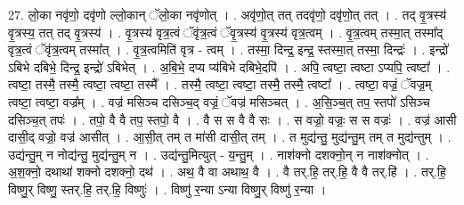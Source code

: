 \documentclass[17pt]{extarticle}
\begin{document}
27. लो॒का नवृ॑णो॒ दवृ॑णो ल्लो॒कान् ॅलो॒का नवृ॑णोत् । . अवृ॑णो॒त् तत् तदवृ॑णो॒ दवृ॑णो॒त् तत् । . तद् वृ॒त्रस्य॑ वृ॒त्रस्य॒ तत् तद् वृ॒त्रस्य॑ । . वृ॒त्रस्य॑ वृत्र॒त्वं ॅवृ॑त्र॒त्वं ॅवृ॒त्रस्य॑ वृ॒त्रस्य॑ वृत्र॒त्वम् । . वृ॒त्र॒त्वम् तस्मा॒त् तस्मा᳚द् वृत्र॒त्वं ॅवृ॑त्र॒त्वम् तस्मा᳚त् । . वृ॒त्र॒त्वमिति॑ वृत्र - त्वम् । . तस्मा॒ दिन्द्र॒ इन्द्र॒ स्तस्मा॒त् तस्मा॒ दिन्द्रः॑ । . इन्द्रो॑ ऽबिभे दबिभे॒ दिन्द्र॒ इन्द्रो॑ ऽबिभेत् । . अ॒बि॒भे॒ दप्य प्य॑बिभे दबिभे॒दपि॑ । . अपि॒ त्वष्टा॒ त्वष्टा ऽप्यपि॒ त्वष्टा᳚ । . त्वष्टा॒ तस्मै॒ तस्मै॒ त्वष्टा॒ त्वष्टा॒ तस्मै᳚ । . तस्मै॒ त्वष्टा॒ त्वष्टा॒ तस्मै॒ तस्मै॒ त्वष्टा᳚ । . त्वष्टा॒ वज्रं॒ ॅवज्र॒म् त्वष्टा॒ त्वष्टा॒ वज्र᳚म् । . वज्र॑ मसिञ्च दसिञ्च॒द् वज्रं॒ ॅवज्र॑ मसिञ्चत् । . अ॒सि॒ञ्च॒त् तप॒ स्तपो॑ ऽसिञ्च दसिञ्च॒त् तपः॑ । . तपो॒ वै वै तप॒ स्तपो॒ वै । . वै स स वै वै सः । . स वज्रो॒ वज्रः॒ स स वज्रः॑ । . वज्र॑ आसी दासी॒द् वज्रो॒ वज्र॑ आसीत् । . आ॒सी॒त् तम् त मा॑सी दासी॒त् तम् । . त मुद्य॑न्तु॒ मुद्य॑न्तु॒म् तम् त मुद्य॑न्तुम् । . उद्य॑न्तु॒म् न नोद्य॑न्तु॒ मुद्य॑न्तु॒म् न । . उद्य॑न्तु॒मित्युत् - य॒न्तु॒म् । . नाश॑क्नो दशक्नो॒न् न नाश॑क्नोत् । . अ॒श॒क्नो॒ दथाथा॑ शक्नो दशक्नो॒ दथ॑ । . अथ॒ वै वा अथाथ॒ वै । . वै तर्.हि॒ तर्.हि॒ वै वै तर्.हि॑ । . तर्.हि॒ विष्णु॒र् विष्णु॒ स्तर्.हि॒ तर्.हि॒ विष्णुः॑ । . विष्णु॑ र॒न्या ऽन्या विष्णु॒र् विष्णु॑ र॒न्या । \newline
\end{document}
